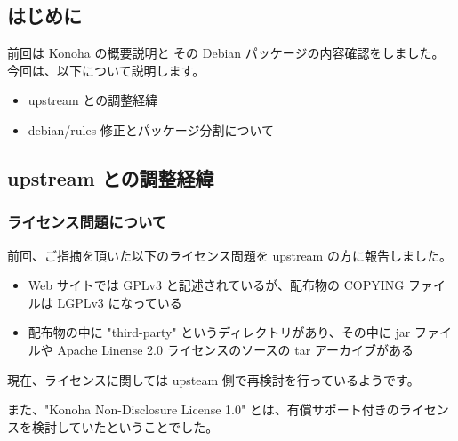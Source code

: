 \documentclass[mingoth,a4paper]{jsarticle}
\begin{document}
\subsection{はじめに}
前回は Konoha の概要説明と その Debian パッケージの内容確認をしました。
今回は、以下について説明します。
\begin{itemize}
\item upstream との調整経緯
\item debian/rules 修正とパッケージ分割について
\end{itemize}

\subsection{upstream との調整経緯}
\subsubsection{ライセンス問題について}
前回、ご指摘を頂いた以下のライセンス問題を upstream の方に報告しました。
\begin{itemize}
\item Web サイトでは GPLv3 と記述されているが、配布物の COPYING ファイルは LGPLv3 になっている
\item 配布物の中に "third-party" というディレクトリがあり、その中に jar ファイルや Apache Linense 2.0 ライセンスのソースの tar アーカイブがある
\end{itemize}

現在、ライセンスに関しては upsteam 側で再検討を行っているようです。

また、"Konoha Non-Disclosure License 1.0" とは、有償サポート付きのライセンスを検討していたということでした。
\end{document}

